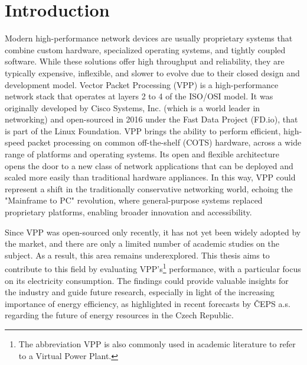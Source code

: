 \chapter*{Introduction}
\setcounter{page}{1}


Modern high-performance network devices are usually proprietary systems that combine custom hardware, specialized operating systems, and tightly coupled software. 
While these solutions offer high throughput and reliability, they are typically expensive, inflexible, and slower to evolve due to their closed design and development model.
Vector Packet Processing (VPP) is a high-performance network stack that operates at layers 2 to 4 of the ISO/OSI model. 
It was originally developed by Cisco Systems, Inc. (which is a world leader in networking) and open-sourced in 2016 under the Fast Data Project (FD.io), that is part of the Linux Foundation.
VPP brings the ability to perform efficient, high-speed packet processing on common off-the-shelf (COTS) hardware, across a wide range of platforms and operating systems.
Its open and flexible architecture opens the door to a new class of network applications that can be deployed and scaled more easily than traditional hardware appliances. 
In this way, VPP could represent a shift in the traditionally conservative networking world, echoing the "Mainframe to PC" revolution, 
where general-purpose systems replaced proprietary platforms, enabling broader innovation and accessibility.

Since VPP was open-sourced only recently, it has not yet been widely adopted by the market, and there are only a limited number of academic studies on the subject. As a result, this area remains underexplored. 
This thesis aims to contribute to this field by evaluating VPP's\footnote{The abbreviation VPP is also commonly used in academic literature to refer to a Virtual Power Plant.} performance, 
with a particular focus on its electricity consumption. 
The findings could provide valuable insights for the industry and guide future research, especially in light of the increasing importance of energy efficiency, 
as highlighted in recent forecasts by ČEPS a.s. regarding the future of energy resources in the Czech Republic.

